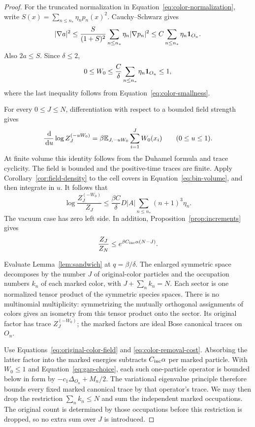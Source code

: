 \begin{proof}
For the truncated normalization in
Equation~\eqref{eq:color-normalization}, write
$S(x)=\sum_{n\le n_*}\eta_np_n(x)^2$.
Cauchy--Schwarz gives
\[
 |\nabla a|^2
 \le\frac{S}{(1+S)^2}
               \sum_{n\le n_*}\eta_n|\nabla p_n|^2
 \le C\sum_{n\le n_*}\eta_n\mathbf 1_{O_n}.
\]
Also $2a\le S$.  Since $\delta\le2$,
\begin{equation}\label{eq:color-field-bound}
 0\le W_0\le\frac C\delta
                  \sum_{n\le n_*}\eta_n\mathbf 1_{O_n}\le1,
\end{equation}
where the last inequality follows from
Equation~\eqref{eq:color-smallness}.

For every $0\le J\le N$, differentiation with respect
to a bounded field strength gives
\[
 \frac{\,\mathrm d}{\,\mathrm d u}\log Z_J^{(-uW_0)}
 =\beta\mathbb E_{J,-uW_0}\sum_{i=1}^J W_0(x_i)
 \qquad(0\le u\le1).
\]
At finite volume this identity follows from the
Duhamel formula and trace cyclicity.  The field is
bounded and the positive-time traces are finite.
Apply Corollary~\ref{cor:field-density} to the cell
covers in Equation~\eqref{eq:bin-volume}, and then
integrate in $u$.  It follows that
\begin{equation}\label{eq:original-color-field}
 \log\frac{Z_J^{(-W_0)}}{Z_J}
 \le\frac{\beta C}{\delta}D|A|
                     \sum_{n\le n_*}(n+1)^3\eta_n.
\end{equation}
The vacuum case has zero left side.  In addition,
Proposition~\ref{prop:increments} gives
\begin{equation}\label{eq:color-removal-cost}
 \frac{Z_J}{Z_N}\le e^{\beta C_{\rm inc}\alpha(N-J)}.
\end{equation}

Evaluate Lemma~\ref{lem:sandwich} at $q=\beta/\delta$.
The enlarged symmetric space decomposes by the number
$J$ of original-color particles and the occupation
numbers $k_n$ of each marked color, with
$J+\sum_n k_n=N$.  Each sector is one normalized
tensor product of the symmetric species spaces.
There is no multinomial multiplicity: symmetrizing
the mutually orthogonal assignments of colors gives
an isometry from this tensor product onto the sector.
Its original factor has trace $Z_J^{(-W_0)}$;
the marked factors are ideal Bose canonical traces
on $O_n$.

Use Equations~\eqref{eq:original-color-field} and
\eqref{eq:color-removal-cost}.  Absorbing the latter
factor into the marked energies subtracts
$C_{\rm inc}\alpha$ per marked particle.  With
$W_0\le1$ and Equation~\eqref{eq:gap-choice}, each
such one-particle operator is bounded below in form
by $-c_1\Delta_{O_n}+M_n/2$.  The variational
eigenvalue principle therefore bounds every fixed
marked canonical trace by that operator's trace.
We may then drop the restriction $\sum_nk_n\le N$
and sum the independent marked occupations.  The
original count is determined by those occupations
before this restriction is dropped, so no extra
sum over $J$ is introduced.


\end{proof}
